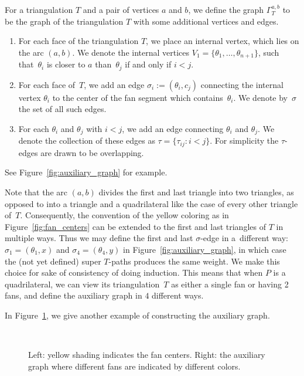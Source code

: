 For a triangulation $T$ and a pair of vertices $a$ and $b$, we define the graph $\Gamma_T^{a,b}$ to be the graph of the triangulation $T$ with some additional vertices and edges.
\begin{enumerate}\itemsep=0pt
 \item For each face of the triangulation $T$, we place an internal vertex, which lies on the arc $(a,b)$.
 We denote the internal vertices $V_1=\{\theta_1,\dots,\theta_{n+1}\}$, such that~$\theta_i$ is closer to $a$ than~$\theta_j$ if and only if $i<j$.

 \item For each face of~$T$, we add an edge $\sigma_i := (\theta_i, c_j)$ connecting the internal vertex $\theta_i$ to the center of the fan segment which contains~$\theta_i$.
 We denote by~$\sigma$ the set of all such edges.

 \item For each $\theta_i$ and $\theta_j$ with $i<j$, we add an edge connecting $\theta_i$ and $\theta_j$.
 We denote the collection of these edges as $\tau = \{\tau_{ij}\colon i<j\}$. For simplicity the $\tau$-edges are drawn to be overlapping.
\end{enumerate}
See Figure~\ref{fig:auxiliary_graph} for example.


\begin{Remark}\rm
 Note that the arc $(a,b)$ divides the first and last triangle into two triangles, as opposed to into a triangle and a quadrilateral
 like the case of every other triangle of~$T$. Consequently, the convention of the yellow coloring as in Figure~\ref{fig:fan_centers}
 can be extended to the first and last triangles of $T$ in multiple ways.
 Thus we may define the first and last $\sigma$-edge in a~different way: $\sigma_1=(\theta_1,x)$ and $\sigma_4=(\theta_4,y)$ in Figure~\ref{fig:auxiliary_graph},
 in which case the (not yet defined) super $T$-paths produces the same weight. We make this choice for sake of consistency of doing induction.
 This means that when $P$ is a quadrilateral, we can view its triangulation~$T$ as either a single fan or having 2 fans, and define the auxiliary graph in $4$ different ways.
\end{Remark}
In Figure~\ref{fig:bigger_auxiliary_graph}, we give another example of constructing the auxiliary graph.

\begin{figure}[h!]
\centering
 \ \ 
\caption{Left: yellow shading indicates the fan centers. Right: the auxiliary graph where different fans are indicated by different colors.}
\label{fig:bigger_auxiliary_graph}
\end{figure}

